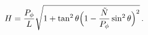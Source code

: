 \begin{equation}
\label{Hab1}
H=\frac{P_\phi}{L}\sqrt{1+\tan^2{\theta}\Bigl(1-\frac{\tilde N}{P_\phi}
\sin^2{\theta}\Bigr)^2}\, .
\end{equation}

